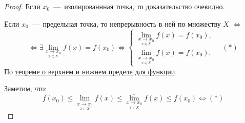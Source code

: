 \begin{proof}
    Если $x_{0}$~---~изолированнная точка, то доказательство очевидно.

    Если $x_{0}$~---~предельная точка, то непрерывность в ней по множеству $X$ $\Leftrightarrow$
    $$\Leftrightarrow \exists \lim\limits_{\underset{x \subset X}{x \to x_{0}}} f(x) = f(x_{0}) \Leftrightarrow \begin{cases}
        \overline{\lim\limits_{\underset{x \in X}{x\to x_0}}} f(x) =  f(x_{0}), \\
        \lim\limits_{\overline{\underset{x \in X}{x\to x_0}}} f(x) =  f(x_{0}).
    \end{cases} \quad (*)$$
    По \hyperlink{thrm4.10}{теореме о верхнем и нижнем пределе для функции}.

    Заметим, что:
    $$f(x_{0}) \leq\lim\limits_{\overline{\underset{x \in X}{x\to x_0}}} f(x) \leq \overline{\lim\limits_{\underset{x \in X}{x\to x_0}}} f(x) \leq f(x_{0}) \Leftrightarrow (*)$$
\end{proof}